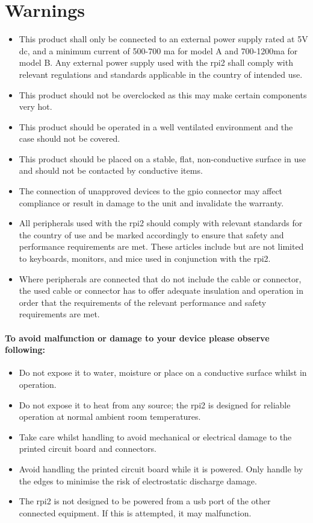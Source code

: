 \section{Warnings}
\begin{itemize}
\item This product shall only be connected to an external power supply rated at 5V dc, and a minimum current of 500-700 \gls{ma} for model A and 700-1200\gls{ma} for model B. Any external power supply used with the \gls{rpi2} shall comply with relevant regulations and standards applicable in the country of intended use. 
\item This product should not be overclocked as this may make certain components very hot. 
\item This product should be operated in a well ventilated environment and the case should not be covered. 
\item This product should be placed on a stable, flat, non-conductive surface in use and should not be contacted by conductive items. 
\item The connection of unapproved devices to the \gls{gpio} connector may affect compliance or result in damage to the unit and invalidate the warranty. 
\item All peripherals used with the \gls{rpi2} should comply with relevant standards for the country of use and be marked accordingly to ensure that safety and performance requirements are met. These articles include but are not limited to keyboards, monitors, and mice used in conjunction with the \gls{rpi2}.
\item Where peripherals are connected that do not include the cable or connector, the used cable or connector has to offer adequate insulation and operation in order that the requirements of the relevant performance and safety requirements are met.
\end{itemize}
\paragraph{To avoid malfunction or damage to your device please observe following:}
\begin{itemize}
\item Do not expose it to water, moisture or place on a conductive surface whilst in operation.
\item Do not expose it to heat from any source; the \gls{rpi2} is designed for reliable operation at normal ambient room temperatures.
\item Take care whilst handling to avoid mechanical or electrical damage to the printed circuit board and connectors.
\item Avoid handling the printed circuit board while it is powered. Only handle by the edges to minimise the risk of electrostatic discharge damage.
\item The \gls{rpi2} is not designed to be powered from a \gls{usb} port of the other connected equipment. If this is attempted, it may malfunction.
\end{itemize}



